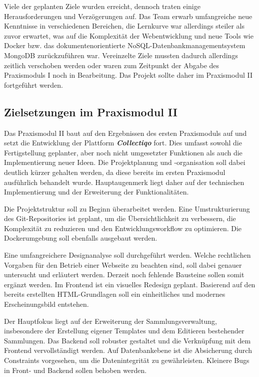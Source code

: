 Viele der geplanten Ziele wurden erreicht, dennoch traten einige Herausforderungen und Verzögerungen auf.
Das Team erwarb umfangreiche neue Kenntnisse in verschiedenen Bereichen, die Lernkurve war allerdings steiler als zuvor erwartet, was auf die Komplexität der Webentwicklung und neue Tools wie Docker bzw. das dokumentenorientierte NoSQL-Datenbankmanagementsystem MongoDB zurückzuführen war.
Vereinzelte Ziele mussten dadurch allerdings zeitlich verschoben werden oder waren zum Zeitpunkt der Abgabe des Praxismoduls I noch in Bearbeitung.
Das Projekt sollte daher im Praxismodul II fortgeführt werden.

\newpage

\subsection{Zielsetzungen im Praxismodul II}\label{subsec:subsection-one-two}

Das Praxismodul II baut auf den Ergebnissen des ersten Praxismoduls auf und setzt die Entwicklung der Plattform \textbf{\textit{Collectiqo}} fort.
Dies umfasst sowohl die Fertigstellung geplanter, aber noch nicht umgesetzter Funktionen als auch die Implementierung neuer Ideen.
Die Projektplanung und -organisation soll dabei deutlich kürzer gehalten werden, da diese bereits im ersten Praxismodul ausführlich behandelt wurde.
Hauptaugenmerk liegt daher auf der technischen Implementierung und der Erweiterung der Funktionalitäten.

Die Projektstruktur soll zu Beginn überarbeitet werden.
Eine Umstrukturierung des Git-Repositories ist geplant, um die Übersichtlichkeit zu verbessern, die Komplexität zu reduzieren und den Entwicklungsworkflow zu optimieren.
Die Dockerumgebung soll ebenfalls ausgebaut werden.

Eine umfangreichere Designanalyse soll durchgeführt werden.
Welche rechtlichen Vorgaben für den Betrieb einer Webseite zu beachten sind, soll dabei genauer untersucht und erläutert werden.
Derzeit noch fehlende Bausteine sollen somit ergänzt werden.
Im Frontend ist ein visuelles Redesign geplant.
Basierend auf den bereits erstellten HTML-Grundlagen soll ein einheitliches und modernes Erscheinungsbild entstehen.

Der Hauptfokus liegt auf der Erweiterung der Sammlungsverwaltung, insbesondere der Erstellung eigener Templates und dem Editieren bestehender Sammlungen.
Das Backend soll robuster gestaltet und die Verknüpfung mit dem Frontend vervollständigt werden.
Auf Datenbankebene ist die Absicherung durch Constraints vorgesehen, um die Datenintegrität zu gewährleisten.
Kleinere Bugs in Front- und Backend sollen behoben werden.


